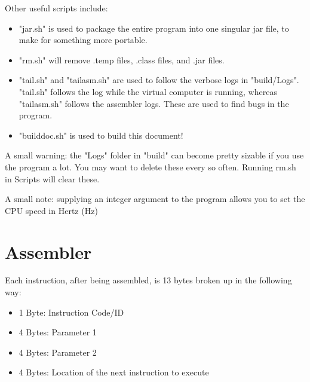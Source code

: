 \documentclass[12pt]{article}
\begin{document}
\vspace{12pt}

Other useful scripts include:

\begin{itemize}

\item
"jar.sh" is used to package the entire program into one singular jar file, to make for something more portable.

\item
"rm.sh" will remove .temp files, .class files, and .jar files.

\item
"tail.sh" and "tailasm.sh" are used to follow the verbose logs in "build/Logs".
"tail.sh" follows the log while the virtual computer is running,
whereas "tailasm.sh" follows the assembler logs.
These are used to find bugs in the program.

\item
"builddoc.sh" is used to build this document!

\end{itemize}

A small warning: the "Logs" folder in "build" can become pretty sizable if you use the program a lot.
You may want to delete these every so often. Running rm.sh in Scripts will clear these.

A small note: supplying an integer argument to the program allows you to set the CPU speed in Hertz (Hz)

\section{Assembler}

\vspace{12pt}

Each instruction, after being assembled, is 13 bytes broken up in the following way:
\begin{itemize}

\item
1 Byte: Instruction Code/ID

\item
4 Bytes: Parameter 1

\item
4 Bytes: Parameter 2

\item
4 Bytes: Location of the next instruction to execute

\end{itemize}
\end{document}
